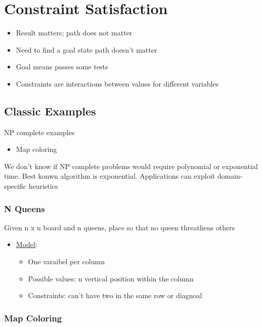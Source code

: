 \section{Constraint Satisfaction}

  \begin{itemize}
    \item Result matters; path does not matter
    \item Need to find a goal state path doesn't matter
    \item Goal means passes some tests
    \item Constraints are interactions between values for different variables
  \end{itemize}

  \subsection{Classic Examples}

    NP complete examples
    \begin{itemize}
      \item Map coloring
    \end{itemize}

    We don't know if NP complete problems would require polynomial or
    exponential time. Best konwn algorithm is exponential.
    Applications can exploit domain-specific heuristics

    \subsubsection{N Queens}

      Given n x n board and n queens, place so that no queen threathens others

      \begin{itemize}
        \item \ul{Model}:
        \begin{itemize}
          \item One varaibel per column
          \item Possible values: n vertical position within the column
          \item Constraints: can't have two in the same row or diagnoal
        \end{itemize}
      \end{itemize}

    \subsubsection{Map Coloring}

